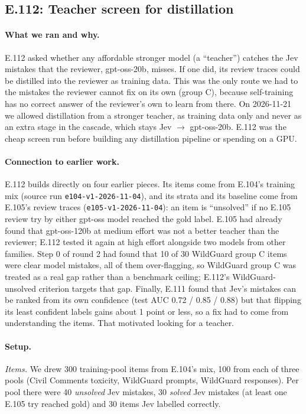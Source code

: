 \documentclass[11pt]{article}
\renewcommand{\_}{\origunderscore\allowbreak}
\begin{document}
\subsection{E.112: Teacher screen for distillation}\label{sec:e112}

\paragraph{What we ran and why.}
E.112 asked whether any affordable stronger model (a ``teacher'') catches the Jev mistakes that the reviewer, gpt-oss-20b, misses. If one did, its review traces could be distilled into the reviewer as training data. This was the only route we had to the mistakes the reviewer cannot fix on its own (group C), because self-training has no correct answer of the reviewer's own to learn from there. On 2026-11-21 we allowed distillation from a stronger teacher, as training data only and never as an extra stage in the cascade, which stays Jev $\rightarrow$ gpt-oss-20b. E.112 was the cheap screen run before building any distillation pipeline or spending on a GPU.

\paragraph{Connection to earlier work.}
E.112 builds directly on four earlier pieces. Its items come from E.104's training mix (source run \texttt{e104-v1-2026-11-04}), and its strata and its baseline come from E.105's review traces (\texttt{e105-v1-2026-11-04}): an item is ``unsolved'' if no E.105 review try by either gpt-oss model reached the gold label. E.105 had already found that gpt-oss-120b at medium effort was not a better teacher than the reviewer; E.112 tested it again at high effort alongside two models from other families. Step 0 of round 2 had found that 10 of 30 WildGuard group C items were clear model mistakes, all of them over-flagging, so WildGuard group C was treated as a real gap rather than a benchmark ceiling; E.112's WildGuard-unsolved criterion targets that gap. Finally, E.111 found that Jev's mistakes can be ranked from its own confidence (test AUC 0.72 / 0.85 / 0.88) but that flipping its least confident labels gains about 1 point or less, so a fix had to come from understanding the items. That motivated looking for a teacher.

\paragraph{Setup.}
\emph{Items.} We drew 300 training-pool items from E.104's mix, 100 from each of three pools (Civil Comments toxicity, WildGuard prompts, WildGuard responses). Per pool there were 40 \emph{unsolved} Jev mistakes, 30 \emph{solved} Jev mistakes (at least one E.105 try reached gold) and 30 items Jev labelled correctly.
\end{document}

